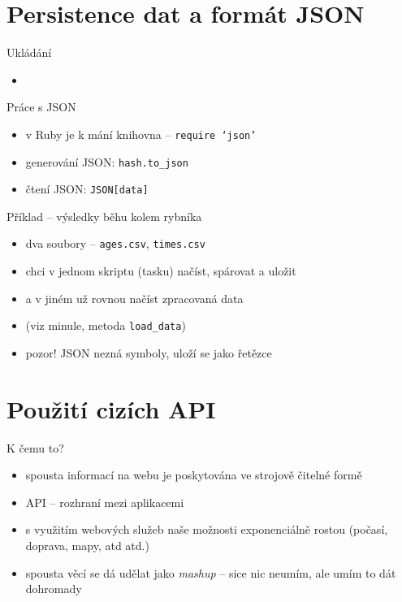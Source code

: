 \documentclass{beamer}
\begin{document}
\section{Persistence dat a formát JSON}

\begin{frame}{Ukládání }
  \begin{itemize}
    \item 
  \end{itemize}
\end{frame}

\begin{frame}{Práce s JSON}
  \begin{itemize}
    \item v Ruby je k mání knihovna -- \texttt{require `json'}
    \item generování JSON: \texttt{hash.to\_json}
    \item čtení JSON: \texttt{JSON[data]}
  \end{itemize}
\end{frame}

\begin{frame}{Příklad -- výsledky běhu kolem rybníka}
  \begin{itemize}
    \item dva soubory -- \texttt{ages.csv}, \texttt{times.csv}
    \item chci v jednom skriptu (tasku) načíst, spárovat a uložit
    \item a v jiném už rovnou načíst zpracovaná data 
    \item (viz minule, metoda \texttt{load\_data})
    \item pozor! JSON nezná symboly, uloží se jako řetězce
  \end{itemize}
\end{frame}

\section{Použití cizích API}

\begin{frame}{K čemu to?}
  \begin{itemize}
    \item spousta informací na webu je poskytována ve strojově čitelné formě
    \item API -- rozhraní mezi aplikacemi 
    \item s využitím webových služeb naše možnosti exponenciálně rostou (počasí, doprava, mapy, atd atd.)
    \item spousta věcí se dá udělat jako \emph{mashup} -- sice nic neumím, ale umím to dát dohromady
  \end{itemize}
\end{frame}
\end{document}
